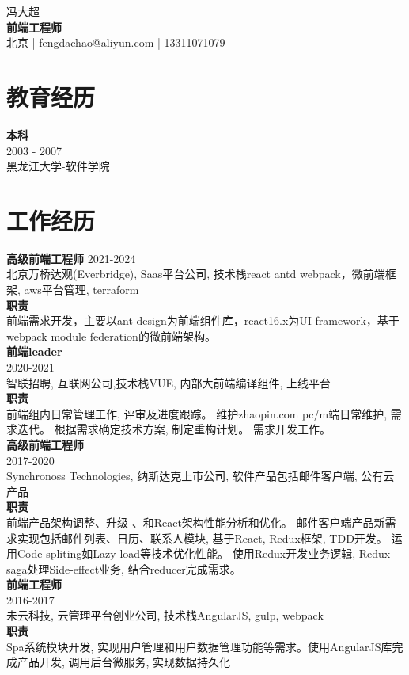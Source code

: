 \documentclass[a4paper,9pt]{extarticle}
\begin{document}
\pagestyle{empty}

\begin{center}
冯大超\\[3pt] %
\textbf{前端工程师}\\[1pt] %
北京 | \href{mailto:fengdachao@aliyun.com}{fengdachao@aliyun.com} | 13311071079 %
\end{center}


\section*{教育经历}
\noindent
\newline
\textbf{本科} \\
2003 - 2007 \\ 
黑龙江大学-软件学院 \\


\section*{工作经历}
\noindent
\newline
\noindent
\textbf{高级前端工程师}
2021-2024 \\
北京万桥达观(Everbridge), Saas平台公司, 技术栈react antd webpack，微前端框架, aws平台管理, terraform \\
\textbf{职责} \\
前端需求开发，主要以ant-design为前端组件库，react16.x为UI framework，基于webpack module federation的微前端架构。 \\

\noindent
\textbf{前端leader} \\
2020-2021 \\
智联招聘, 互联网公司,技术栈VUE, 内部大前端编译组件, 上线平台 \\ 
\textbf{职责} \\
前端组内日常管理工作, 评审及进度跟踪。 维护zhaopin.com pc/m端日常维护, 需求迭代。 根据需求确定技术方案, 制定重构计划。 需求开发工作。 \\ 

\noindent
\textbf{高级前端工程师} \\
2017-2020 \\
Synchronoss Technologies, 纳斯达克上市公司, 软件产品包括邮件客户端, 公有云产品 \\
\textbf{职责} \\
前端产品架构调整、升级 、和React架构性能分析和优化。 邮件客户端产品新需求实现包括邮件列表、日历、联系人模块, 基于React, Redux框架, TDD开发。 运用Code-spliting如Lazy load等技术优化性能。 使用Redux开发业务逻辑, Redux-saga处理Side-effect业务, 结合reducer完成需求。\\

\noindent
\textbf{前端工程师} \\
2016-2017  \\
未云科技, 云管理平台创业公司, 技术栈AngularJS, gulp, webpack\\
\textbf{职责} \\
Spa系统模块开发, 实现用户管理和用户数据管理功能等需求。使用AngularJS库完成产品开发, 调用后台微服务, 实现数据持久化 \\


\end{document}
